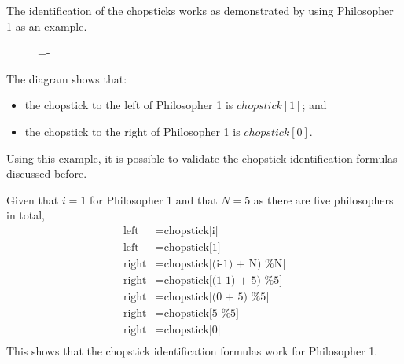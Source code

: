 \documentclass[a4paper]{systems-software}
\begin{document}
The identification of the chopsticks works as demonstrated by using Philosopher 1 as an example.

\begin{figure}[H]
  \lineskip=-\fboxrule
\end{figure}

The diagram shows that:
\begin{itemize}
	\item the chopstick to the left of Philosopher 1 is $chopstick[1]$; and
	\item the chopstick to the right of Philosopher 1 is $chopstick[0]$.
\end{itemize}

Using this example, it is possible to validate the chopstick identification formulas discussed before.

Given that $i = 1$ for Philosopher 1 and that $N = 5$ as there are five philosophers in total,
\begin{equation*}
	\begin{aligned}
		\text{left} & = \text{chopstick[i]} \\
		\text{left} & = \text{chopstick[1]} \\
		\text{right} & = \text{chopstick[(i-1) + N) \% N]} \\
		\text{right} & = \text{chopstick[(1-1) + 5) \% 5]} \\
		\text{right} & = \text{chopstick[(0 + 5) \% 5]} \\
		\text{right} & = \text{chopstick[5 \% 5]} \\
		\text{right} & = \text{chopstick[0]} \\
	\end{aligned}
\end{equation*}
This shows that the chopstick identification formulas work for Philosopher 1.
\end{document}
